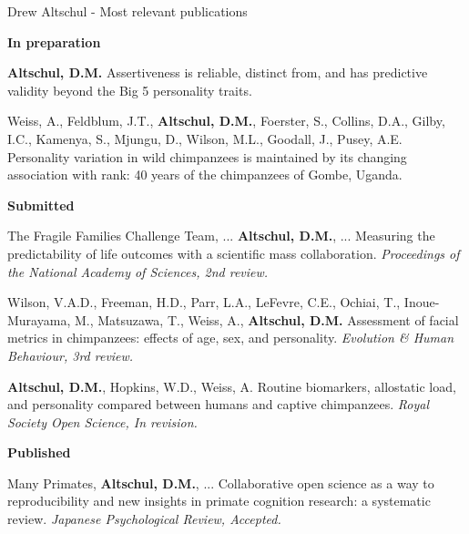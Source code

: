 \documentclass[margin,line]{res}
\begin{document}
Drew Altschul - Most relevant publications



{\bf In preparation}


{\bf Altschul, D.M.} Assertiveness is reliable, distinct from, and has predictive validity beyond the Big 5 personality traits.


Weiss, A., Feldblum, J.T., {\bf Altschul, D.M.}, Foerster, S., Collins, D.A., Gilby, I.C., Kamenya, S., Mjungu, D., Wilson, M.L., Goodall, J., Pusey, A.E. Personality variation in wild chimpanzees is maintained by its changing association with rank: 40 years of the chimpanzees of Gombe, Uganda. 

{\bf Submitted}

The Fragile Families Challenge Team, ... {\bf Altschul, D.M.}, ... Measuring the predictability of life outcomes with a scientific mass collaboration. {\it Proceedings of the National Academy of Sciences, 2nd review.}

Wilson, V.A.D., Freeman, H.D., Parr, L.A., LeFevre, C.E., Ochiai, T., Inoue-Murayama, M., Matsuzawa, T., Weiss, A., {\bf Altschul, D.M.} Assessment of facial metrics in chimpanzees: effects of age, sex, and personality. {\it Evolution \& Human Behaviour, 3rd review.}



{\bf Altschul, D.M.}, Hopkins, W.D., Weiss, A. Routine biomarkers, allostatic load, and personality compared between humans and captive chimpanzees. {\it  Royal Society Open Science, In revision.}

{\bf Published}

Many Primates, {\bf Altschul, D.M.}, ... Collaborative open science as a way to reproducibility and new insights in primate cognition research: a systematic review. {\it Japanese Psychological Review, Accepted.}
\end{document}
